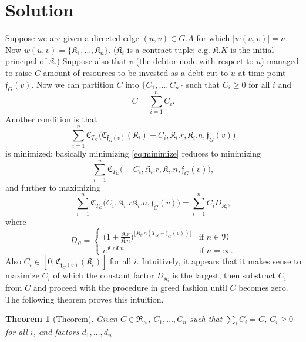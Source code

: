 \documentclass[10pt]{article}
\newcommand{\RR}{\mathfrak{R}}
\newcommand{\KK}{\mathfrak{K}}
\newcommand{\CC}{\mathfrak{C}}
\newcommand{\ff}{\mathfrak{f}}
\newtheorem{thm}{Theorem}
\begin{document}
\section{Solution}
Suppose we are given a directed edge $(u, v) \in G.A$ for which $|w(u,v)| = n$. Now $w(u, v) = \{ \mathfrak{K}_1, \dots, \mathfrak{K}_n \}$. ($\mathfrak{K}_i$ is a contract tuple; e.g. $\mathfrak{K}.K$ is the initial principal of $\mathfrak{K}$.) Suppose also that $v$ (the debtor node with respect to $u$) managed to raise $C$ amount of resources to be invested as a debt cut to $u$ at time point $\mathfrak{f}_G(v)$. Now we can partition $C$ into  $\{ C_1, \dots, C_n \}$ such that $C_i \geq 0$ for all $i$ and 
\begin{equation}
C = \sum_{i = 1}^n C_i.
\end{equation}
Another condition is that 
\begin{equation}
\label{eq:minimize}
\sum_{i = 1}^n \mathfrak{C}_{T_G} \big( \mathfrak{C}_{\mathfrak{f}_G(v)}(\mathfrak{K}_i) - C_i, \mathfrak{K}_i.r, \mathfrak{K}_i.n, \mathfrak{f}_G(v) \big)
\end{equation}
is minimized; basically minimizing \eqref{eq:minimize} reduces to minimizing
\begin{equation}
\label{eq:minimize_reduced}
\sum_{i = 1}^n \CC_{T_G} \big( - C_i, \KK_i.r, \KK_i. n, \ff_G(v) \big),
\end{equation}
and further to maximizing 
\begin{equation}
\label{eq:maximize}
\sum_{i = 1}^n \CC_{T_G} \big( C_i, \KK_i.r \KK_i.n, \ff_G(v) \big) =
\sum_{i = 1}^n C_i D_{\KK_i},
\end{equation}
where 
\[
D_{\KK} = 
\begin{cases}
\Big( 1 + \frac{ \KK.r }{ \KK.n} \Big)^{ \lfloor \KK_i.n ( T_G - \ff_G(v) ) \rfloor } & \mbox{if } n \in \mathfrak{N} \\
e^{ \KK.r \KK.n} & \mbox{if } n = \infty.
\end{cases}
\]
Also $C_i \in [0, \CC_{\ff_G(v)}(\KK_i)]$ for all $i$. Intuitively, it appears that it makes sense to maximize $C_i$ of which the constant factor  $D_{\KK_i}$ is the largest, then substract $C_i$ from $C$ and proceed with the procedure in greed fashion until $C$ becomes zero. The following theorem proves this intuition.
\begin{thm}[Theorem]
Given $C \in \RR_>$, ${C_1, \dots, C_n}$ such that $\sum_i C_i = C$, $C_i \geq 0$ for all $i$, and factors ${d_1, \dots, d_n}$
\end{thm}
\end{document}
